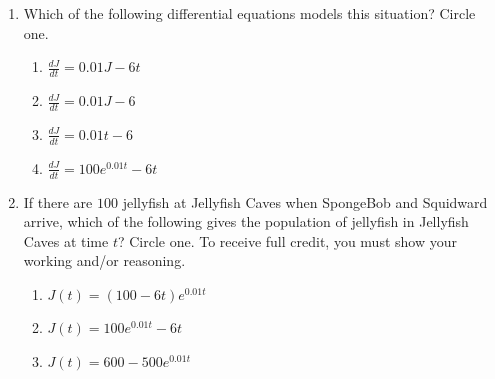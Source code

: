 \documentclass{article}
\begin{document}
\begin{enumerate}
\begin{problem}
\begin{enumerate}[resume] 
\item 
\begin{problem}
Which of the following differential equations models this situation? Circle one.
\end{problem}
        \begin{enumerate}[label=\Alph*.]
            \item $\frac{dJ}{dt}=0.01J-6t$
            \item $\frac{dJ}{dt}=0.01J-6$
            \item $\frac{dJ}{dt}=0.01t-6$
            \item $\frac{dJ}{dt}=100e^{0.01t}-6t$
        \end{enumerate}
        \item If there are $100$ jellyfish at Jellyfish Caves when SpongeBob and Squidward arrive, which of the following gives the population of jellyfish in Jellyfish Caves at time $t$? Circle one. To receive full credit, you must show your working and/or reasoning.
        \begin{enumerate}[label=\Alph*.]
            \item $J(t)=(100-6t)e^{0.01t}$
            \item $J(t)=100e^{0.01t}-6t$
            \item $J(t)=600-500e^{0.01t}$
        \end{enumerate}
    \end{enumerate}
\end{problem}




\end{enumerate}
\end{document}
